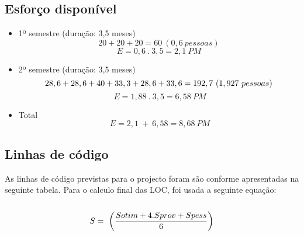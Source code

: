 \documentclass[12pt, a4paper, twoside]{report} %
\begin{document}
\subsection{Esforço disponível}

\begin{itemize}

\item 1º semestre (duração: 3,5 meses)
\begin{equation}
20+20+20 = 60 \ (0,6 \ pessoas)
\end{equation}
\begin{equation}
E = 0,6 \ . \ 3,5 = 2,1 \ PM
\end{equation}
\item 2º semestre (duração: 3,5 meses)
\begin{equation}
28,6+28,6+40+33,3+28,6+33,6 = 192,7 \ (1,927 \ pessoas)\\
\end{equation}
\begin{equation}
\ E = 1,88 \ . \ 3,5 = 6,58 \ PM
\end{equation}
\item Total
\begin{equation}
\ E = 2,1 \ + \ 6,58 = 8,68 \ PM
\end{equation}
\end{itemize}

\subsection{Linhas de código}

As linhas de código previstas para o projecto foram são conforme apresentadas na seguinte tabela. Para o calculo final das LOC, foi usada a seguinte equação:
\\
\\

\begin{equation} S = \ \bigg({Sotim + 4 . Sprov + Spess \over 6}\bigg)
\end{equation}

\clearpage
\end{document}
